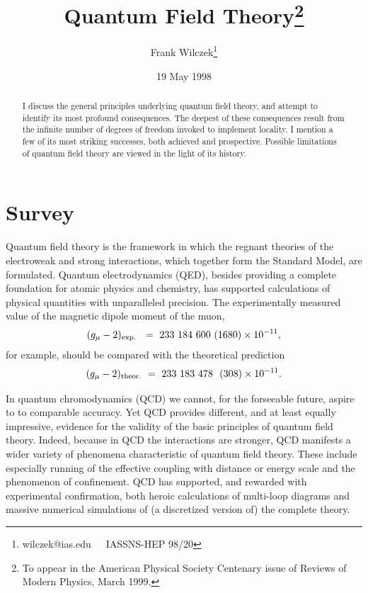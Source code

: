 \documentclass[12pt]{article}
\begin{document}
\date{ 19 May 1998 }
\title{Quantum Field Theory\thanks{To appear in the American Physical
Society Centenary issue of Reviews of Modern Physics, March 1999.}}

\author{Frank Wilczek\thanks{wilczek@ias.edu~~~IASSNS-HEP 98/20}}

\maketitle

\begin{abstract}

I discuss the general principles underlying quantum field theory, and
attempt to identify its most profound consequences.  The deepest of
these consequences result from the infinite number of degrees of
freedom invoked to implement locality.  I mention a few of its most
striking successes, both achieved and prospective.  Possible
limitations of quantum field theory are viewed in the light of its history.

\end{abstract}

\newpage
\section{Survey}

Quantum field theory is the framework in which the regnant theories of
the electroweak and strong interactions, which together form the
Standard Model, are formulated.  Quantum electrodynamics (QED),
besides providing a complete foundation for atomic physics and
chemistry, has supported calculations of physical quantities with
unparalleled precision.  The experimentally measured value of the magnetic
dipole moment of the muon, 
\begin{equation}
(g_\mu -2)_{\rm exp.~} ~=~
233 ~184 ~600~ (1680) \times 10^{-11},
\end{equation}
for example,
should be compared with the theoretical prediction
\begin{equation}
(g_\mu-2)_{\rm theor.} ~=~ 233~ 183~ 478 ~~(308)
\times 10^{-11}.
\end{equation}

In quantum chromodynamics (QCD) we
cannot, for the forseeable future, aspire to to comparable accuracy.
Yet QCD provides different, and at least equally impressive, evidence
for the validity of the basic principles of quantum field theory.
Indeed, because in QCD the interactions are stronger, QCD
manifests a wider variety of phenomena characteristic of quantum field
theory.  These include especially running of the effective coupling
with distance or energy scale and the phenomenon of confinement.  QCD
has supported, and rewarded with experimental confirmation, both
heroic calculations of multi-loop diagrams and massive numerical
simulations of (a discretized version of) the complete theory.
\end{document}

